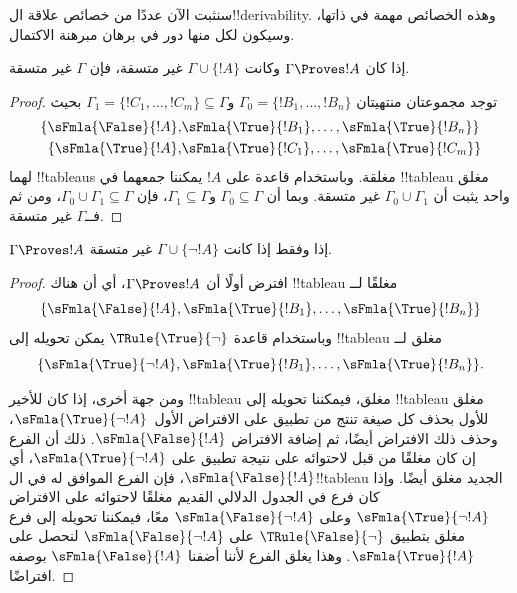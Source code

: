 \documentclass[../../../include/open-logic-section]{subfiles}
\begin{document}
      {}
      {}


سنثبت الآن عددًا من خصائص علاقة ال!!{derivability}. وهذه الخصائص مهمة في
ذاتها، وسيكون لكل منها دور في برهان مبرهنة الاكتمال.

\begin{prop}
  إذا كان $\Gamma \Proves !A$ وكانت $\Gamma \cup \{!A\}$ غير متسقة،
  فإن $\Gamma$ غير متسقة.
\end{prop}

\begin{proof}
توجد مجموعتان منتهيتان $\Gamma_0 = \{!B_1, \dots, !B_n\}$ و$\Gamma_1
  =\{!C_1, \dots, !C_m\} \subseteq \Gamma$ بحيث
  \begin{align*}
    \{\sFmla{\False}{!A}, &
    \sFmla{\True}{!B_1}, \dots, \sFmla{\True}{!B_n}\} \\
    \{\sFmla{\True}{!A}, &
    \sFmla{\True}{!C_1}, \dots, \sFmla{\True}{!C_m}\}
  \end{align*}
  لهما !!{tableau}s مغلقة. وباستخدام قاعدة \Cut{} على $!A$ يمكننا
  جمعهما في !!{tableau} مغلق واحد يثبت أن $\Gamma_0
  \cup \Gamma_1$ غير متسقة. وبما أن $\Gamma_0
  \subseteq \Gamma$ و$\Gamma_1 \subseteq \Gamma$، فإن $\Gamma_0 \cup
  \Gamma_1 \subseteq \Gamma$، ومن ثم
  فــ$\Gamma$ غير متسقة.
\end{proof}

\begin{prop}
$\Gamma \Proves !A$ إذا وفقط إذا كانت $\Gamma \cup \{\lnot !A\}$ غير متسقة.
\end{prop}

\begin{proof}
افترض أولًا أن $\Gamma \Proves !A$، أي أن هناك !!{tableau} مغلقًا لــ
\[
\{\sFmla{\False}{!A},
\sFmla{\True}{!B_1}, \dots, \sFmla{\True}{!B_n}\}
\]
وباستخدام قاعدة $\TRule{\True}{\lnot}$ يمكن تحويله إلى !!{tableau}
مغلق لــ
\[
\{\sFmla{\True}{\lnot !A},
\sFmla{\True}{!B_1}, \dots, \sFmla{\True}{!B_n}\}.
\]

ومن جهة أخرى، إذا كان للأخير !!{tableau} مغلق، فيمكننا تحويله إلى
!!{tableau} مغلق للأول بحذف كل صيغة تنتج من تطبيق
\TRule{\True}{\lnot} على الافتراض الأول~$\sFmla{\True}{\lnot !A}$،
وحذف ذلك الافتراض أيضًا، ثم إضافة الافتراض $\sFmla{\False}{!A}$. ذلك
أن الفرع إن كان مغلقًا من قبل لاحتوائه على نتيجة تطبيق
\TRule{\True}{\lnot} على $\sFmla{\True}{\lnot !A}$، أي
$\sFmla{\False}{!A}$، فإن الفرع الموافق له في ال!!{tableau} الجديد مغلق
أيضًا. وإذا كان فرع في الجدول الدلالي القديم مغلقًا لاحتوائه على الافتراض
$\sFmla{\True}{\lnot !A}$ وعلى $\sFmla{\False}{\lnot
  !A}$ معًا، فيمكننا
تحويله إلى فرع مغلق بتطبيق $\TRule{\False}{\lnot}$ على
$\sFmla{\False}{\lnot !A}$ لنحصل على $\sFmla{\True}{!A}$. وهذا يغلق
الفرع لأننا أضفنا $\sFmla{\False}{!A}$ بوصفه افتراضًا.
\end{proof}
\end{document}
